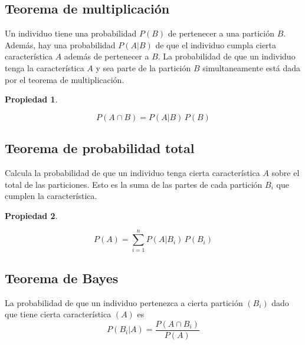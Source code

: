 \documentclass[a5paper,12pt,twoside]{book}
\newtheorem{prop}{{Propiedad}}[chapter]
\begin{document}
\subsection{Teorema de multiplicación}

Un individuo tiene una probabilidad $P(B)$ de pertenecer a una partición $B$.
Además, hay una probabilidad $P(A|B)$ de que el individuo cumpla cierta característica $A$ además de pertenecer a $B$.
La probabilidad de que un individuo tenga la característica $A$ y sea parte de la partición $B$ simultaneamente está dada por el teorema de multiplicación.

\begin{mdframed}[style=PropertyFrame]
    \begin{prop}
    \end{prop}
    \begin{equation*}
        P(A \cap B) = P(A|B) \, P(B)
    \end{equation*}
\end{mdframed}


\subsection{Teorema de probabilidad total}

Calcula la probabilidad de que un individuo tenga cierta característica $A$ sobre el total de las particiones.
Esto es la suma de las partes de cada partición $B_i$ que cumplen la característica.

\begin{mdframed}[style=PropertyFrame]
    \begin{prop}
    \end{prop}
    \begin{equation*}
        P(A) = \sum_{i=1}^n P(A|B_i) \, P(B_i)
    \end{equation*}
\end{mdframed}


\subsection{Teorema de Bayes}

La probabilidad de que un individuo pertenezca a cierta partición $(B_i)$ dado que tiene cierta característica $(A)$ es
\begin{equation*}
    P(B_i|A) = \frac{P(A \cap B_i)}{P(A)}
\end{equation*}
\end{document}
